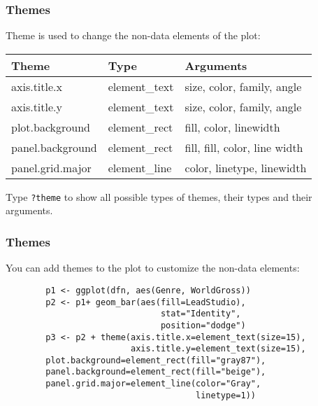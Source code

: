 \documentclass{beamer}
\begin{document}
	\begin{frame}[fragile]
		\frametitle{Themes}

		Theme is used to change the non-data elements of the plot:

		\vspace{1em}

		\begin{center}
		\begin{tabular}{|l|l|l|}
		\hline
    		Theme & Type & Arguments \\ 
		\hline
		axis.title.x & element\_text & size, color, family, angle \\
		\hline
		axis.title.y & element\_text & size, color, family, angle \\
		\hline
		plot.background & element\_rect & fill, color, linewidth \\
		\hline
		panel.background & element\_rect & fill, fill, color, line width \\
		\hline
		panel.grid.major & element\_line & color, linetype, linewidth \\
		\hline
		\end{tabular}
		\end{center}

		\vspace{1em}

		Type \verb|?theme| to show all possible types of themes, their types and their arguments.

	\end{frame}

	\begin{frame}[fragile]
		\frametitle{Themes}

		You can add themes to the plot to customize the non-data elements:

		\vspace{1em}

		\begin{exampleblock}{}
		\begin{BVerbatim}
		p1 <- ggplot(dfn, aes(Genre, WorldGross)) 
		p2 <- p1+ geom_bar(aes(fill=LeadStudio), 
		                       stat="Identity",
		                       position="dodge")
		p3 <- p2 + theme(axis.title.x=element_text(size=15),
		                 axis.title.y=element_text(size=15),
		plot.background=element_rect(fill="gray87"),
		panel.background=element_rect(fill="beige"),
		panel.grid.major=element_line(color="Gray",
		                              linetype=1))
		\end{BVerbatim}
		\end{exampleblock}{}

	\end{frame}
\end{document}

